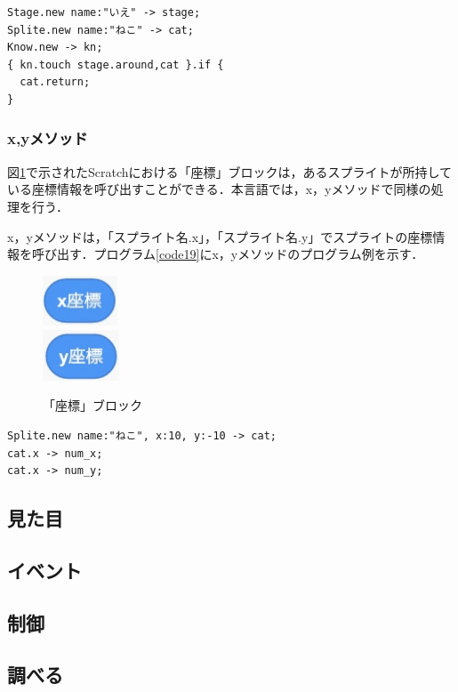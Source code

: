 \documentclass[10pt,a4j]{ltjsarticle}
\begin{document}
\begin{lstlisting}[caption=returnメソッドのプログラム例, label=code18]
Stage.new name:"いえ" -> stage;
Splite.new name:"ねこ" -> cat;
Know.new -> kn;
{ kn.touch stage.around,cat }.if {
  cat.return;
}
\end{lstlisting}

\subsubsection{x,yメソッド}
図\ref{fig:xy}で示されたScratchにおける「座標」ブロックは，あるスプライトが所持している座標情報を呼び出すことができる．本言語では，x，yメソッドで同様の処理を行う．

x，yメソッドは，「スプライト名.x」，「スプライト名.y」でスプライトの座標情報を呼び出す．プログラム\ref{code19}にx，yメソッドのプログラム例を示す．

\begin{figure}[H]
  \centering
  \includegraphics[height=15mm]{images/x.pdf} \\
  \includegraphics[height=15mm]{images/y.pdf} 
  \caption{「座標」ブロック}
  \label{fig:xy}
\end{figure}

\begin{lstlisting}[caption=xyメソッドのプログラム例, label=code19]
Splite.new name:"ねこ", x:10, y:-10 -> cat;
cat.x -> num_x;
cat.x -> num_y;
\end{lstlisting}
\subsection{見た目}

\subsection{イベント}
\subsection{制御}
\subsection{調べる}
\end{document}
